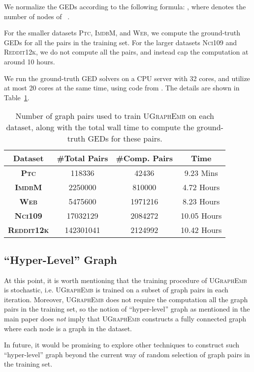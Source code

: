 \documentclass{article}
\newcommand{\model}{\textsc{UGraphEmb}\xspace}
\newcommand{\ptc}{\textsc{Ptc}\xspace}
\newcommand{\imdb}{\textsc{ImdbM}\xspace}
\newcommand{\web}{\textsc{Web}\xspace}
\newcommand{\nci}{\textsc{Nci109}\xspace}
\newcommand{\reddit}{\textsc{Reddit12k}\xspace}
\begin{document}
We normalize the GEDs according to the following formula: , where  denotes the number of nodes of ~\cite{qureshi2007graph}.





For the smaller datasets \ptc, \imdb, and \web, we compute the ground-truth GEDs for all the pairs in the training set. For the larger datasets \nci and \reddit, we do not compute all the pairs, and instead cap the computation at around 10 hours.

We run the ground-truth GED solvers on a CPU server with 32 cores, and utilize at most 20 cores at the same time, using code from \cite{riesen2013novel}. The details are shown in Table~\ref{table:training_pair_preparation}.


\begin{table}[H]
\small
\begin{tabular}
{cccc} \hline
\textbf{Dataset} & \textbf{\#Total Pairs} & \textbf{\#Comp. Pairs} & \textbf{Time} \\ \hline
\textbf{\ptc} & 118336 & 42436 & 9.23 Mins \\
\textbf{\imdb} & 2250000 & 810000 & 4.72 Hours \\
\textbf{\web} & 5475600 & 1971216 & 8.23 Hours \\
\textbf{\nci} & 17032129 & 2084272 & 10.05 Hours \\
\textbf{\reddit} & 142301041 & 2124992 & 10.42 Hours \\
\hline
\end{tabular}
\centering
\caption{Number of graph pairs used to train \model on each dataset, along with the total wall time to compute the ground-truth GEDs for these pairs.}
\label{table:training_pair_preparation}
\end{table}

\subsection{``Hyper-Level'' Graph}

At this point, it is worth mentioning that the training procedure of \model is stochastic, i.e. \model is trained on a subset of graph pairs in each iteration. Moreover, \model does not require the computation all the graph pairs in the training set, so the notion of ``hyper-level'' graph as mentioned in the main paper does \textit{not} imply that \model constructs a fully connected graph where each node is a graph in the dataset.

In future, it would be promising to explore other techniques to construct such ``hyper-level'' graph beyond the current way of random selection of graph pairs in the training set.
\end{document}
